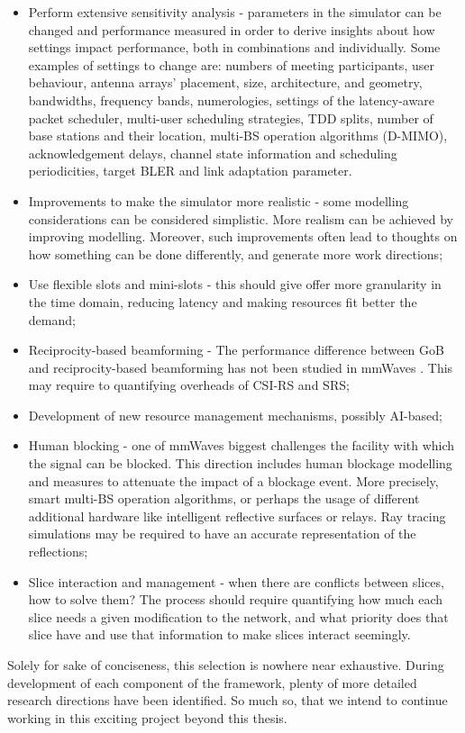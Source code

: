\begin{itemize}
    \item Perform extensive sensitivity analysis - parameters in the simulator can be changed and performance measured in order to derive insights about how settings impact performance, both in combinations and individually. Some examples of settings to change are: numbers of meeting participants, user behaviour, antenna arrays' placement, size, architecture, and geometry, bandwidths, frequency bands, numerologies, settings of the latency-aware packet scheduler, multi-user scheduling strategies, TDD splits, number of base stations and their location, multi-BS operation algorithms (D-MIMO), acknowledgement delays, channel state information and scheduling periodicities, target \acs{BLER} and link adaptation parameter.
    \item Improvements to make the simulator more realistic - some modelling considerations can be considered simplistic. More realism can be achieved by improving modelling. Moreover, such improvements often lead to thoughts on how something can be done differently, and generate more work directions; 
    \item Use flexible slots and mini-slots - this should give offer more granularity in the time domain, reducing latency and making resources fit better the demand;
    \item Reciprocity-based beamforming - The performance difference between \ac{GoB} and reciprocity-based beamforming has not been studied in mmWaves \cite{tddVSfdd_massiveMIMO}. This may require to quantifying overheads of CSI-RS and SRS;
    \item Development of new resource management mechanisms, possibly AI-based;
    \item Human blocking - one of mmWaves biggest challenges the facility with which the signal can be blocked. This direction includes human blockage modelling and measures to attenuate the impact of a blockage event. More precisely, smart multi-BS operation algorithms, or perhaps the usage of different additional hardware like intelligent reflective surfaces \cite{8936989} or relays. Ray tracing simulations may be required to have an accurate representation of the reflections;
    \item Slice interaction and management - when there are conflicts between slices, how to solve them? The process should require quantifying how much each slice needs a given modification to the network, and what priority does that slice have and use that information to make slices interact seemingly.
\end{itemize}

Solely for sake of conciseness, this selection is nowhere near exhaustive. During development of each component of the framework, plenty of more detailed research directions have been identified. So much so, that we intend to continue working in this exciting project beyond this thesis.



